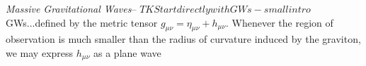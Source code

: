\documentclass[prd,twocolumn,aps,psfig,nofootinbib,nobibnotes,superscriptaddress,preprintnumbers,times]{revtex4-2}
\begin{document}
\textit{Massive Gravitational Waves}--
$TK Start directly with GWs -small intro$ 
GWs...defined by the metric tensor $g_{\mu\nu} = \eta_{\mu\nu} + h_{\mu\nu}$. Whenever the region of observation is much smaller than the radius of curvature induced by the graviton, we may express $h_{\mu\nu}$ as a plane wave \cite{Isi:2018miq}
\end{document}
